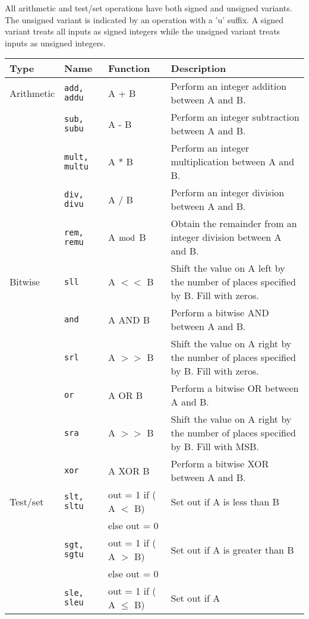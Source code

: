 \documentclass[a4paper,10pt]{article}
\begin{document}
\begin{table}[h]
All arithmetic and test/set operations have both signed and unsigned
variants. The unsigned variant is indicated by an operation with a
'u' suffix. A signed variant treats all inputs as signed integers while
the unsigned variant treats inputs as unsigned integers.

\begin{center}
\begin{tabular}{|l|l|l|p{75mm}|}
\hline
\textbf{Type} & \textbf{Name} & \textbf{Function} 
& \textbf{Description} \\
\hline
Arithmetic & \texttt{add, addu} & A + B & Perform an integer
addition between A and B. \\
\cline{2-4}
& \texttt{sub, subu} & A - B & Perform an integer
subtraction between A and B. \\
\cline{2-4}
& \texttt{mult, multu} & A * B & Perform an
integer multiplication between A and B. \\
\cline{2-4}
& \texttt{div, divu} & A / B & Perform an integer
division between A and B. \\
\cline{2-4} 
& \texttt{rem, remu} & A $\bmod$ B & Obtain the remainder from an
integer division between A and B. \\
\hline
Bitwise & \texttt{sll} & A $<<$ B & Shift the value on A left by the number of
places specified by B. Fill with zeros. \\
\cline{2-4}
& \texttt{and} & A AND B & Perform a bitwise AND between A and B. \\
\cline{2-4}
& \texttt{srl} & A $>>$ B & Shift the value on A right by the number of places
specified by B. Fill with zeros. \\
\cline{2-4}
& \texttt{or} & A OR B & Perform a bitwise OR between A and B.\\
\cline{2-4}
& \texttt{sra} & A $>>$ B & Shift the value on A right by the number of places
specified by B. Fill with MSB.\\
\cline{2-4}
& \texttt{xor} & A XOR B & Perform a bitwise XOR between A and B. \\
\hline
Test/set & \texttt{slt, sltu} & out = 1 if ( A $<$ B) & Set out if A
is less than B\\
& & else out = 0 & \\
\cline{2-4}
& \texttt{sgt, sgtu} & out = 1 if ( A $>$ B) & Set out if A
is greater than B \\
& & else out = 0 & \\
\cline{2-4}
& \texttt{sle, sleu} & out = 1 if ( A $\le$ B) & Set out if A

\end{tabular}
\end{center}
\end{table}
\end{document}
